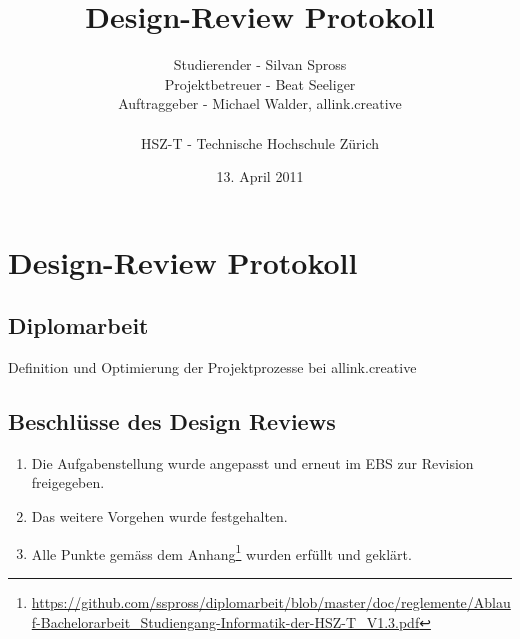 \documentclass[]{scrreprt}
\title{Design-Review Protokoll}
\author{Studierender - Silvan Spross\\
    Projektbetreuer - Beat Seeliger\\
    Auftraggeber - Michael Walder, allink.creative\\
    \\
    HSZ-T - Technische Hochschule Zürich}
\date{13. April 2011}
\begin{document}
    \ifpdf
    \else
    \fi

    \maketitle



    \chapter{Design-Review Protokoll}

    \section{Diplomarbeit}
    Definition und Optimierung der Projektprozesse bei allink.creative

    \section{Beschlüsse des Design Reviews}
    \begin{enumerate}
        \item Die Aufgabenstellung wurde angepasst und erneut im EBS zur Revision freigegeben.
        \item Das weitere Vorgehen wurde festgehalten.
        \item Alle Punkte gemäss dem Anhang\footnote{\url{https://github.com/sspross/diplomarbeit/blob/master/doc/reglemente/Ablauf-Bachelorarbeit_Studiengang-Informatik-der-HSZ-T_V1.3.pdf}} 
            wurden erfüllt und geklärt.
        
    \end{enumerate}
    
\end{document}
